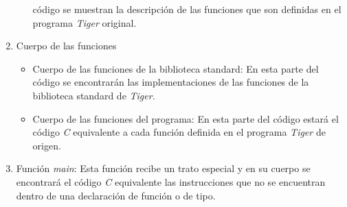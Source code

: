 \documentclass{article}
\begin{document}
\begin{enumerate}
\begin{enumerate}
            código se muestran la descripción de las funciones que son
            definidas en el programa \textit{Tiger} original.
        \end{enumerate}
    \item Cuerpo de las funciones
        \begin{itemize}
            \item Cuerpo de las funciones de la biblioteca standard: En esta
            parte del código se encontrarán las implementaciones de las
            funciones de la biblioteca standard de \textit{Tiger}.
            \item Cuerpo de las funciones del programa: En esta parte del código
            estará el código \textit{C} equivalente a cada función definida en
            el programa \textit{Tiger} de origen.
        \end{itemize}
    \item Función \textit{main}: Esta función recibe un trato especial y en su
    cuerpo se encontrará el código \textit{C} equivalente las instrucciones que
    no se encuentran dentro de una declaración de función o de tipo. 
\end{enumerate}
\end{document}
